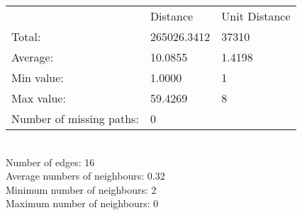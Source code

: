 \begin{tabular}{lll}
 & Distance & Unit Distance\\
Total: & 265026.3412 & 37310\\
Average: & 10.0855 & 1.4198\\
Min value: & 1.0000 & 1\\
Max value: & 59.4269 & 8\\
\hline
Number of missing paths: & 0 &\\
\end{tabular}\\
Number of edges: 16\\
Average numbers of neighbours: 0.32\\
Minimum number of neighbours: 2\\
Maximum number of neighbours: 0\\
